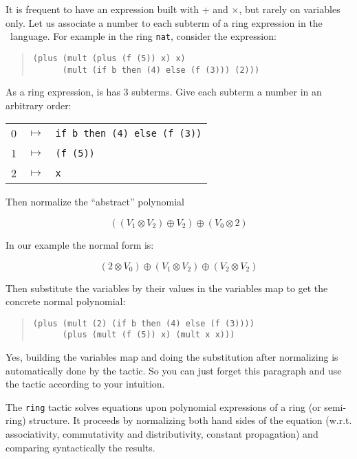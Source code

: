 
It is frequent to have an expression built with + and
  $\times$, but rarely on variables only.
Let us associate a number to each subterm of a ring
expression in the \gallina\ language. For example in the ring
\texttt{nat}, consider the expression:

\begin{quotation}
\begin{verbatim}
(plus (mult (plus (f (5)) x) x)
      (mult (if b then (4) else (f (3))) (2)))
\end{verbatim}
\end{quotation}

\noindent As a ring expression, is has 3 subterms. Give each subterm a
number in an arbitrary order:

\begin{tabular}{ccl}
0 & $\mapsto$ & \verb|if b then (4) else (f (3))| \\
1 & $\mapsto$ & \verb|(f (5))| \\
2 & $\mapsto$ & \verb|x| \\
\end{tabular}

\noindent Then normalize the ``abstract'' polynomial 

$$((V_1 \otimes V_2) \oplus V_2) \oplus (V_0 \otimes 2) $$

\noindent In our example the normal form is:

$$(2 \otimes V_0) \oplus (V_1 \otimes V_2) \oplus (V_2 \otimes V_2)$$

\noindent Then substitute the variables by their values in the variables map to
get the concrete normal polynomial:

\begin{quotation}
\begin{verbatim}
(plus (mult (2) (if b then (4) else (f (3)))) 
      (plus (mult (f (5)) x) (mult x x))) 
\end{verbatim}
\end{quotation}


Yes, building the variables map and doing the substitution after
normalizing is automatically done by the tactic. So you can just forget
this paragraph and use the tactic according to your intuition.


The {\tt ring} tactic solves equations upon polynomial expressions of
a ring (or semi-ring) structure. It proceeds by normalizing both hand
sides of the equation (w.r.t. associativity, commutativity and
distributivity, constant propagation) and comparing syntactically the
results.

